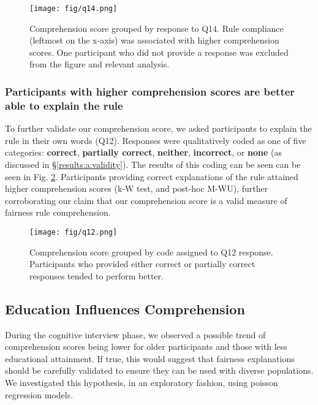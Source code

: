 \documentclass{article}
\begin{document}
\begin{figure}[ht]
    \centering
    \texttt{[image: fig/q14.png]}
    \vspace{-10pt}
    \caption{Comprehension score grouped by response to Q14. Rule compliance (leftmost on the x-axis) was associated with higher comprehension scores. One participant who did not provide a response was excluded from the figure and relevant analysis.}
    \label{fig:q14}
\end{figure}



\subsubsection{Participants with higher comprehension scores are better able to explain the rule}
To further validate our comprehension score, we asked participants to explain the rule in their own words (Q12). Responses were qualitatively coded as one of five categories: \textbf{correct}, \textbf{partially correct}, \textbf{neither}, \textbf{incorrect}, or \textbf{none} (as discussed in \S\ref{results:a:validity}). The results of this coding can be seen can be seen in Fig. \ref{fig:q12}. Participants providing correct explanations of the rule attained higher comprehension scores (k-W test, and post-hoc M-WU), further corroborating our claim that our comprehension score is a valid measure of fairness rule comprehension.


\begin{figure}[ht]
    \centering
    \texttt{[image: fig/q12.png]}
    \vspace{-10pt}
    \caption{Comprehension score grouped by code assigned to Q12 response. Participants who provided either correct or partially correct responses tended to perform better.}
    \label{fig:q12}
    \vspace{-10pt}
\end{figure}



\subsection{Education Influences Comprehension} \label{results:1:rq2}

During the cognitive interview phase, we observed a possible trend of comprehension scores being lower for older participants and those with less educational attainment. If true, this would suggest that fairness explanations should be carefully validated to ensure they can be used with diverse populations. We investigated this hypothesis, in an exploratory fashion, using poisson regression models.
\end{document}
